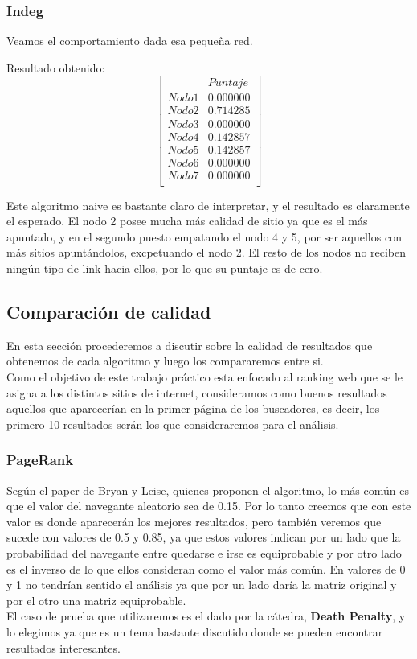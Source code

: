 \subsubsection{Indeg}
 	Veamos el comportamiento dada esa pequeña red.

 	Resultado obtenido:
   $$ 
\begin{bmatrix}
              &    Puntaje \\
 Nodo 1 &    0.000000 \\
 Nodo 2   &  0.714285 \\
 Nodo 3   &  0.000000 \\
 Nodo 4   &  0.142857 \\
 Nodo 5   &  0.142857 \\
 Nodo 6   &  0.000000 \\
 Nodo 7   &  0.000000 \\
\end{bmatrix} 
$$

Este algoritmo naive es bastante claro de interpretar, y el resultado es claramente el esperado. El nodo 2 posee mucha más calidad de sitio ya que es el más apuntado, y en el segundo puesto empatando el nodo 4 y 5, por ser aquellos con más sitios apuntándolos, excpetuando el nodo 2. El resto de los nodos no reciben ningún tipo de link hacia ellos, por lo que su puntaje es de cero.

\subsection{Comparación de calidad}

En esta sección procederemos a discutir sobre la calidad de resultados que obtenemos de cada algoritmo y luego los compararemos entre si.\\
Como el objetivo de este trabajo práctico esta enfocado al ranking web que se le asigna a los distintos sitios de internet, consideramos como buenos resultados aquellos que aparecerían en la primer página de los buscadores, es decir, los primero 10 resultados serán los que consideraremos para el análisis.

\subsubsection{PageRank}
Según el paper de Bryan y Leise, quienes proponen el algoritmo, lo más común es que el valor del navegante aleatorio sea de 0.15. Por lo tanto creemos que con este valor es donde aparecerán los mejores resultados, pero también veremos que sucede con valores de 0.5 y 0.85, ya que estos valores indican por un lado que la probabilidad del navegante entre quedarse e irse es equiprobable y por otro lado es el inverso de lo que ellos consideran como el valor más común. En valores de 0 y 1 no tendrían sentido el análisis ya que por un lado daría la matriz original y por el otro una matriz equiprobable.\\
El caso de prueba que utilizaremos es el dado por la cátedra, \textbf{Death Penalty}, y lo elegimos ya que es un tema bastante discutido donde se pueden encontrar resultados interesantes.



